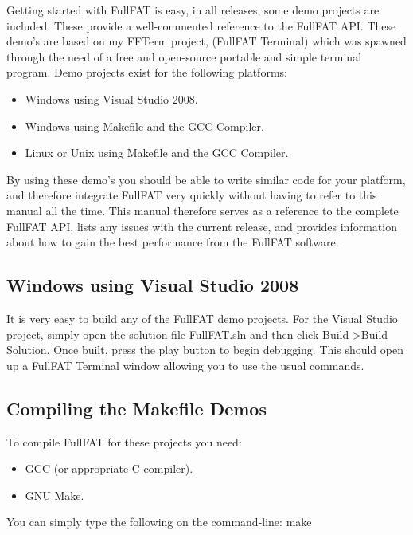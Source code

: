 Getting started with FullFAT is easy, in all releases, some demo projects are included. These provide a well-commented reference to the FullFAT API. These demo's are based on my FFTerm project, (FullFAT Terminal) which was spawned through the need of a free and open-source portable and simple terminal program.
\newline
\newline
Demo projects exist for the following platforms:
\begin{itemize}
\item Windows using Visual Studio 2008.
\item Windows using Makefile and the GCC Compiler.
\item Linux or Unix using Makefile and the GCC Compiler.
\end{itemize}

By using these demo's you should be able to write similar code for your platform, and therefore integrate FullFAT very quickly without having to refer to this manual all the time. This manual therefore serves as a reference to the complete FullFAT API, lists any issues with the current release, and provides information about how to gain the best performance from the FullFAT software.

\subsection{Windows using Visual Studio 2008}
	It is very easy to build any of the FullFAT demo projects. For the Visual Studio project, simply open the solution file FullFAT.sln and then click Build->Build Solution. Once built, press the play button to begin debugging. This should open up a FullFAT Terminal window allowing you to use the usual commands.

\subsection{Compiling the Makefile Demos}
To compile FullFAT for these projects you need:
\begin{itemize}
\item GCC (or appropriate C compiler).
\item GNU Make.
\end{itemize}
You can simply type the following on the command-line:
\newline
\newline
make

